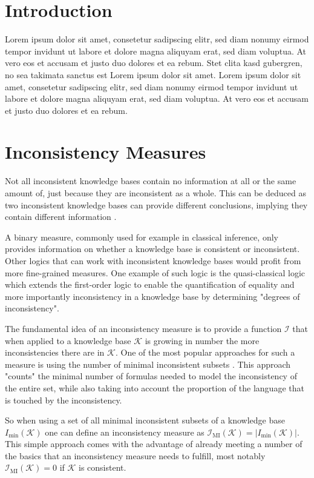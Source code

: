 \section{Introduction}
Lorem ipsum dolor sit amet, consetetur sadipscing elitr, sed diam nonumy eirmod tempor invidunt ut labore et dolore magna aliquyam erat, sed diam voluptua. At vero eos et accusam et justo duo dolores et ea rebum. Stet clita kasd gubergren, no sea takimata sanctus est Lorem ipsum dolor sit amet. Lorem ipsum dolor sit amet, consetetur sadipscing elitr, sed diam nonumy eirmod tempor invidunt ut labore et dolore magna aliquyam erat, sed diam voluptua. At vero eos et accusam et justo duo dolores et ea rebum.

\section{Inconsistency Measures}
Not all inconsistent knowledge bases contain no information at all or the same amount of, just because they are inconsistent as a whole. This can be deduced as two inconsistent knowledge bases can provide different conclusions, implying they contain different information \cite{bertossi_approaches_2005}.

A binary measure, commonly used for example in classical inference, only provides information on whether a knowledge base is consistent or inconsistent. Other logics that can work with inconsistent knowledge bases would profit from more fine-grained measures.
One example of such logic is the quasi-classical logic \cite{grant_measuring_2006} which extends the first-order logic to enable the quantification of equality and more importantly inconsistency in a knowledge base by determining "degrees of inconsistency".

The fundamental idea of an inconsistency measure is to provide a function \(\mathcal{I}\) that when applied to a knowledge base \(\mathcal{K}\) is growing in number the more inconsistencies there are in \(\mathcal{K}\). One of the most popular approaches for such a measure is using the number of minimal inconsistent subsets \cite{hunter_measuring_2008}. This approach "counts" the minimal number of formulas needed to model the inconsistency of the entire set, while also taking into account the proportion of the language that is touched by the inconsistency.

So when using a set of all minimal inconsistent subsets of a knowledge base \(I_{\min}(\mathcal{K})\) one can define an inconsistency measure as \(\mathcal{I}_{\text{MI}}(\mathcal{K}) = \left| I_{\min}(\mathcal{K}) \right|\). This simple approach comes with the advantage of already meeting a number of the basics that an inconsistency measure needs to fulfill, most notably \(\mathcal{I}_{\text{MI}}(\mathcal{K}) = 0\) if \(\mathcal{K}\) is consistent.

